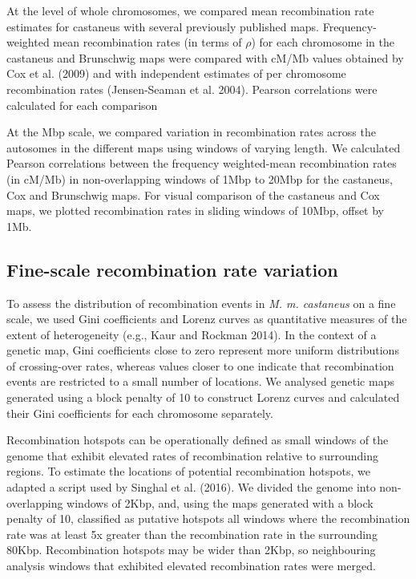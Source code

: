 At the level of whole chromosomes, we compared mean recombination rate estimates for castaneus with several previously published maps. Frequency-weighted mean recombination rates (in terms of $\rho$) for each chromosome in the castaneus and Brunschwig maps were compared with cM/Mb values obtained by Cox et al. (2009) and with independent estimates of per chromosome recombination rates (Jensen-Seaman et al. 2004). Pearson correlations were calculated for each comparison 
 
At the Mbp scale, we compared variation in recombination rates across the autosomes in the different maps using windows of varying length. We calculated Pearson correlations between the frequency weighted-mean recombination rates (in cM/Mb) in non-overlapping windows of 1Mbp to 20Mbp for the castaneus, Cox and Brunschwig maps. For visual comparison of the castaneus and Cox maps, we plotted recombination rates in sliding windows of 10Mbp, offset by 1Mb. 

\subsection{Fine-scale recombination rate variation}

To assess the distribution of recombination events in \textit{M. m. castaneus} on a fine scale, we used Gini coefficients and Lorenz curves as quantitative measures of the extent of heterogeneity (e.g., Kaur and Rockman 2014).  In the context of a genetic map, Gini coefficients close to zero represent more uniform distributions of crossing-over rates, whereas values closer to one indicate that recombination events are restricted to a small number of locations. We analysed genetic maps generated using a block penalty of 10 to construct Lorenz curves and calculated their Gini coefficients for each chromosome separately.

	Recombination hotspots can be operationally defined as small windows of the genome that exhibit elevated rates of recombination relative to surrounding regions. To estimate the locations of potential recombination hotspots, we adapted a script used by Singhal et al. (2016). We divided the genome into non-overlapping windows of 2Kbp, and, using the maps generated with a block penalty of 10, classified as putative hotspots all windows where the recombination rate was at least 5x greater than the recombination rate in the surrounding 80Kbp. Recombination hotspots may be wider than 2Kbp, so neighbouring analysis windows that exhibited elevated recombination rates were merged.

